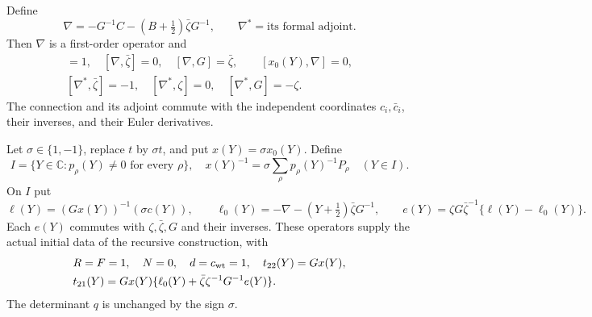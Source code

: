 \begin{theorem}\label{re-initial-connection}
Define
\begin{equation}
 \nabla=-G^{-1}C-(B+\tfrac12)\bar\zeta G^{-1},
 \qquad
 \nabla^*=\text{its formal adjoint}.
                                                               \label{re-connection}
\end{equation}
Then \(\nabla\) is a first-order operator and
\begin{gather}
 [\nabla,\zeta]=1,\quad[\nabla,\bar\zeta]=0,\quad
 [\nabla,G]=\bar\zeta,\qquad
 [x_0(Y),\nabla]=0,                               \label{re-connection-laws}\\
 [\nabla^*,\bar\zeta]=-1,\quad[\nabla^*,\zeta]=0,\quad
 [\nabla^*,G]=-\zeta.                            \label{re-star-laws}
\end{gather}
The connection and its adjoint commute with the independent
coordinates \(c_i,\bar c_i\), their inverses, and their Euler
derivatives.

Let \(\sigma\in\{1,-1\}\), replace \(t\) by \(\sigma t\),
and put \(x(Y)=\sigma x_0(Y)\).  Define
\begin{equation}
 I=\{Y\in\mathbb C:p_\rho(Y)\ne0\text{ for every }\rho\},\quad
 x(Y)^{-1}=\sigma\sum_\rho p_\rho(Y)^{-1}P_\rho\quad(Y\in I).
                                                               \label{re-initial-domain}
\end{equation}
On \(I\) put
\begin{equation}
 \ell(Y)=(Gx(Y))^{-1}(\sigma c(Y)),\qquad
 \ell_0(Y)=-\nabla-(Y+\tfrac12)\bar\zeta G^{-1},\qquad
 e(Y)=\zeta G\bar\zeta^{-1}\{\ell(Y)-\ell_0(Y)\}.
                                                               \label{re-initial-e}
\end{equation}
Each \(e(Y)\) commutes with \(\zeta,\bar\zeta,G\) and their
inverses.  These operators supply the actual initial data of
the recursive construction, with
\begin{equation}
 \begin{aligned}
 &R=F=1,\quad N=0,\quad d=c_{\rm wt}=1,\quad t_{22}(Y)=Gx(Y),\\
 &t_{21}(Y)=Gx(Y)\{\ell_0(Y)+\bar\zeta\zeta^{-1}G^{-1}e(Y)\}.
 \end{aligned}
                                                               \label{re-initial-frame}
\end{equation}
The determinant \(q\) is unchanged by the sign \(\sigma\).
\end{theorem}


